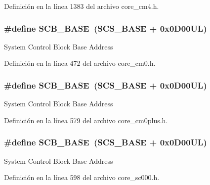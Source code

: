 Definición en la línea 1383 del archivo core\+\_\+cm4.\+h.

\subsubsection[{\texorpdfstring{S\+C\+B\+\_\+\+B\+A\+SE}{SCB_BASE}}]{\setlength{\rightskip}{0pt plus 5cm}\#define S\+C\+B\+\_\+\+B\+A\+SE~({\bf S\+C\+S\+\_\+\+B\+A\+SE} +  0x0\+D00\+U\+L)}\hypertarget{group___c_m_s_i_s__core__base_gad55a7ddb8d4b2398b0c1cfec76c0d9fd}{}\label{group___c_m_s_i_s__core__base_gad55a7ddb8d4b2398b0c1cfec76c0d9fd}
System Control Block Base Address 

Definición en la línea 472 del archivo core\+\_\+cm0.\+h.

\subsubsection[{\texorpdfstring{S\+C\+B\+\_\+\+B\+A\+SE}{SCB_BASE}}]{\setlength{\rightskip}{0pt plus 5cm}\#define S\+C\+B\+\_\+\+B\+A\+SE~({\bf S\+C\+S\+\_\+\+B\+A\+SE} +  0x0\+D00\+U\+L)}\hypertarget{group___c_m_s_i_s__core__base_gad55a7ddb8d4b2398b0c1cfec76c0d9fd}{}\label{group___c_m_s_i_s__core__base_gad55a7ddb8d4b2398b0c1cfec76c0d9fd}
System Control Block Base Address 

Definición en la línea 579 del archivo core\+\_\+cm0plus.\+h.

\subsubsection[{\texorpdfstring{S\+C\+B\+\_\+\+B\+A\+SE}{SCB_BASE}}]{\setlength{\rightskip}{0pt plus 5cm}\#define S\+C\+B\+\_\+\+B\+A\+SE~({\bf S\+C\+S\+\_\+\+B\+A\+SE} +  0x0\+D00\+U\+L)}\hypertarget{group___c_m_s_i_s__core__base_gad55a7ddb8d4b2398b0c1cfec76c0d9fd}{}\label{group___c_m_s_i_s__core__base_gad55a7ddb8d4b2398b0c1cfec76c0d9fd}
System Control Block Base Address 

Definición en la línea 598 del archivo core\+\_\+sc000.\+h.

